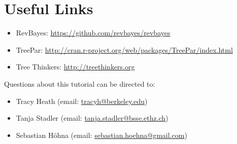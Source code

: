 \bigskip
\section*{Useful Links}

\begin{itemize}
\item RevBayes: \href{https://github.com/revbayes/revbayes}{https://github.com/revbayes/revbayes} \\ \vspace{-7mm}
\item TreePar: \href{http://cran.r-project.org/web/packages/TreePar/index.html}{http://cran.r-project.org/web/packages/TreePar/index.html} \\ \vspace{-7mm}
\item Tree Thinkers: \href{http://treethinkers.org/}{http://treethinkers.org} \\ \vspace{-7mm}
\end{itemize}

Questions about this tutorial can be directed to: \\\vspace{-10mm}
\begin{itemize}
\item Tracy Heath (email: \href{mailto:tracyh@berkeley.edu}{tracyh@berkeley.edu}) \\\vspace{-8mm}
\item Tanja Stadler (email: \href{mailto:tanja.stadler@bsse.ethz.ch}{tanja.stadler@bsse.ethz.ch}) \\\vspace{-8mm} 
\item Sebastian H\"{o}hna (email: \href{mailto:sebastian.hoehna@gmail.com}{sebastian.hoehna@gmail.com})
\end{itemize}
